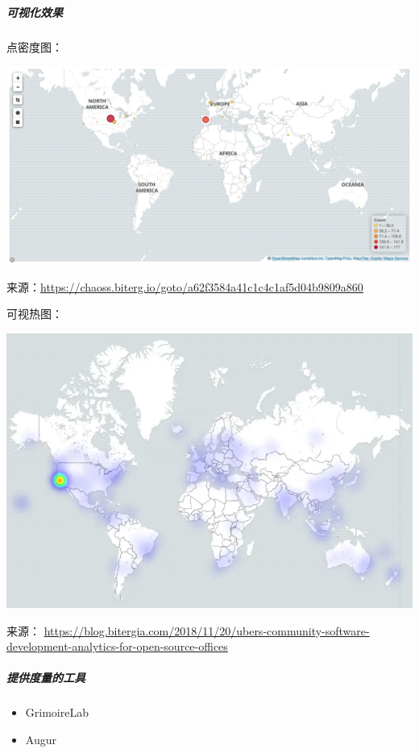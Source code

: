 \hypertarget{ux53efux89c6ux5316ux6548ux679c}{%
\subparagraph{可视化效果}\label{ux53efux89c6ux5316ux6548ux679c}}

点密度图：

\includegraphics{images/contributor-location_dot-density-map.png}

来源：\href{https://chaoss.biterg.io/goto/a62f3584a41c1c4c1af5d04b9809a860}{https://chaoss.biterg.io/goto/a62f3584a41c1c4c1af5d04b9809a860}

可视热图：

\includegraphics{images/contributor-location_heatmap.png}

来源：
\href{https://blog.bitergia.com/2018/11/20/ubers-community-software-development-analytics-for-open-source-offices}{https://blog.bitergia.com/2018/11/20/ubers-community-software-development-analytics-for-open-source-offices}

\hypertarget{ux63d0ux4f9bux5ea6ux91cfux7684ux5de5ux5177}{%
\subparagraph{提供度量的工具}\label{ux63d0ux4f9bux5ea6ux91cfux7684ux5de5ux5177}}

\begin{itemize}
\tightlist
\item
  GrimoireLab
\item
  Augur
\end{itemize}

